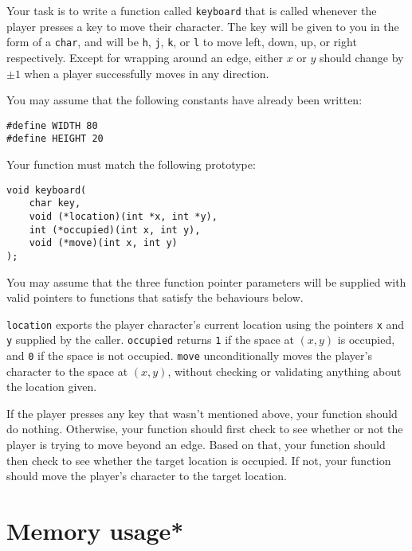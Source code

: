 \documentclass[a4paper,12pt]{article}
\begin{document}
Your task is to write a function called \texttt{keyboard} that is
called whenever the player presses a key to move their character. The
key will be given to you in the form of a \texttt{char}, and will be
\texttt{\textquotesingle{}h\textquotesingle},
\texttt{\textquotesingle{}j\textquotesingle},
\texttt{\textquotesingle{}k\textquotesingle}, or
\texttt{\textquotesingle{}l\textquotesingle} to move left, down, up, or
right respectively. Except for wrapping around an edge, either $x$ or
$y$ should change by $\pm 1$ when a player successfully moves in any
direction.

You may assume that the following constants have already been written:

\begin{lstlisting}
#define WIDTH 80
#define HEIGHT 20
\end{lstlisting}

Your function must match the following prototype:

\begin{lstlisting}
void keyboard(
	char key,
	void (*location)(int *x, int *y),
	int (*occupied)(int x, int y),
	void (*move)(int x, int y)
);
\end{lstlisting}

You may assume that the three function pointer parameters will be
supplied with valid pointers to functions that satisfy the behaviours
below.

\texttt{location} exports the player character’s current location using
the pointers \texttt{x} and \texttt{y} supplied by the caller.
\texttt{occupied} returns \texttt{1} if the space at $(x, y)$ is
occupied, and \texttt{0} if the space is not occupied. \texttt{move}
unconditionally moves the player’s character to the space at $(x, y)$,
without checking or validating anything about the location given.

If the player presses any key that wasn’t mentioned above, your
function should do nothing. Otherwise, your function should first check
to see whether or not the player is trying to move beyond an edge.
Based on that, your function should then check to see whether the
target location is occupied. If not, your function should move the
player’s character to the target location.

\newpage

\section{Memory usage*}
\end{document}
